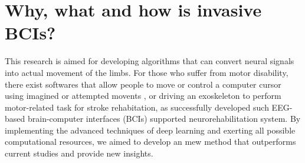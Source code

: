
\section{Why, what and how is invasive BCIs?}
\label{sec:why_what_how_is_invasive_BCI}
This research is aimed for developing algorithms that can convert neural signals into actual movement of the limbs. 
For those who suffer from motor disability, 
there exist softwares that allow people to move or control a computer cursor using imagined or attempted movents \citep{hosman2019bci}, 
or driving an exoskeleton to perform motor-related task for stroke rehabitation, 
as \cite{chowdhury2018active} successfully developed such EEG-based brain-computer interfaces (BCIs) supported neurorehabilitation system. 
By implementing the advanced techniques of deep learning and exerting all possible computational resources, 
we aimed to develop an mew method that outperforms current studies and provide new insights.

